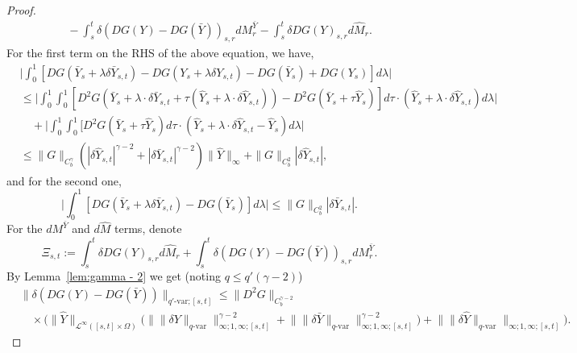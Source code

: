 \documentclass[11pt,reqno]{amsart}
\numberwithin{equation}{section}
\begin{document}
\begin{proof}
\begin{align}
&\quad - \int_{s}^{t} \delta (DG(Y) - DG(\bar Y))_{s,r} d M^{\bar Y}_r - \int_{s}^{t} \delta DG(Y)_{s,r} d \hat M_r. 
\end{align}
For the first term on the RHS of the above equation, we have, 
\begin{align} \nonumber
&\Big| \int_{0}^{1} [ DG(\bar Y_{s} + \lambda \delta \bar Y_{s,t}) - DG(Y_{s} + \lambda \delta Y_{s,t}) - DG(\bar Y_{s}) + DG(Y_{s}) ] d\lambda \Big| \\  \nonumber
&\le \Big| \int_{0}^{1} \int_{0}^{1} [ D^2 G(\bar Y_s + \lambda \cdot\delta \bar Y_{s,t} + \tau (\hat Y_{s} + \lambda \cdot \delta \hat Y_{s,t}) ) - D^2 G(\bar Y_s + \tau \hat Y_s) ]d\tau \cdot (\hat Y_s + \lambda \cdot \delta \hat Y_{s,t}) d\lambda\Big| \\  \nonumber
&\quad + \Big| \int_{0}^{1}\int_{0}^{1} [D^{2} G(\bar Y_{s} + \tau \hat Y_{s}) d\tau \cdot (\hat Y_{s} + \lambda\cdot \delta \hat Y_{s,t} - \hat Y_s) d\lambda \Big|\\  \label{e:identity DH - DH - DH + DH}
& \le \|G\|_{C^{\gamma}_b}( |\delta \hat Y_{s,t}|^{\gamma - 2} + |\delta \bar Y_{s,t}|^{\gamma - 2}) \|\hat Y\|_{\infty} + \|G\|_{C^{2}_{b}} |\delta \hat Y_{s,t}| ,
\end{align}
and for the second one, 
\begin{equation}\label{e:DH - DH}
\Big| \int_{0}^{1} [ DG(\bar Y_{s} + \lambda \delta \bar Y_{s,t}) - DG(\bar Y_{s})]d\lambda \Big| \le \|G\|_{C^{2}_{b}} |\delta \bar Y_{s,t}|.
\end{equation}
For the $d M^{\bar Y}$ and $d \hat M$ terms, denote 
\begin{equation*}
\Xi_{s,t} := \int_{s}^{t} \delta DG(Y)_{s,r} d \hat M_r + \int_{s}^{t} \delta (DG(Y) - DG(\bar Y))_{s,r} d M^{\bar Y}_r.
\end{equation*}
By Lemma~\ref{lem:gamma - 2} we get (noting $q \le q' (\gamma - 2)$) 
\begin{equation*}
\begin{aligned}
&\| \delta (DG(Y) - DG(\bar Y)) \|_{q'\text{-}\mathrm{var};[s,t]} \le \|D^2 G\|_{C^{\gamma - 2}_b}\\
&\quad \times \Big( \|\hat Y\|_{\mathcal L^{\infty}([s,t]\times\Omega)} \big( \big\| \|\delta Y\|_{q\text{-}\mathrm{var}} \big\|^{\gamma - 2}_{\infty;1,\infty;[s,t]} + \big\| \|\delta \bar Y\|_{q\text{-}\mathrm{var}} \big\|^{\gamma - 2}_{\infty;1,\infty;[s,t]}\big) + \big\| \|\delta \hat Y\|_{q\text{-}\mathrm{var}} \big\|_{\infty;1,\infty;[s,t]} \Big). 
\end{aligned}
\end{equation*}

\end{proof}
\end{document}
